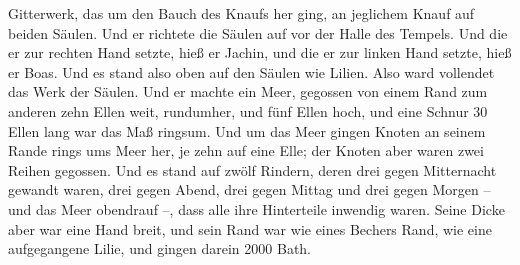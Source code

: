 Gitterwerk, das um den Bauch des Knaufs her ging, an jeglichem Knauf auf
beiden Säulen.  Und er richtete die Säulen auf vor der
Halle des Tempels. Und die er zur rechten Hand setzte, hieß er Jachin,
und die er zur linken Hand setzte, hieß er Boas.  Und es
stand also oben auf den Säulen wie Lilien. Also ward vollendet das Werk
der Säulen.  Und er machte ein Meer, gegossen von einem
Rand zum anderen zehn Ellen weit, rundumher, und fünf Ellen hoch, und
eine Schnur 30 Ellen lang war das Maß ringsum.  Und um
das Meer gingen Knoten an seinem Rande rings ums Meer her, je zehn auf
eine Elle; der Knoten aber waren zwei Reihen gegossen. 
Und es stand auf zwölf Rindern, deren drei gegen Mitternacht gewandt
waren, drei gegen Abend, drei gegen Mittag und drei gegen Morgen -- und
das Meer obendrauf --, dass alle ihre Hinterteile inwendig waren.
 Seine Dicke aber war eine Hand breit, und sein Rand war
wie eines Bechers Rand, wie eine aufgegangene Lilie, und gingen darein
2000 Bath.

